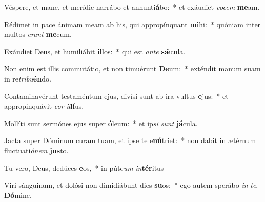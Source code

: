 \item Véspere, et mane, et merídie narrábo et annunti\textbf{á}bo:~* et exáudiet \textit{vo}\textit{cem} \textbf{me}am.
\item Rédimet in pace ánimam meam ab his, qui appropínquant \textbf{mi}hi:~* quóniam inter multos \textit{e}\textit{rant} \textbf{me}cum.
\item Exáudiet Deus, et humiliábit \textbf{il}los:~* qui est \textit{an}\textit{te} \textbf{sǽ}cula.
\item Non enim est illis commutátio, et non timuérunt \textbf{De}um:~* exténdit manum suam in re\textit{tri}\textit{bu}\textbf{én}do.
\item Contaminavérunt testaméntum ejus, divísi sunt ab ira vultus \textbf{e}jus:~* et appropinquávit \textit{cor} \textit{il}\textbf{lí}us.
\item Mollíti sunt sermónes ejus super \textbf{ó}leum:~* et ip\textit{si} \textit{sunt} \textbf{já}cula.
\item Jacta super Dóminum curam tuam, et ipse te e\textbf{nú}triet:~* non dabit in ætérnum fluctuati\textit{ó}\textit{nem} \textbf{jus}to.
\item Tu vero, Deus, dedúces \textbf{e}os,~* in púte\textit{um} \textit{in}\textbf{tér}itus
\item Viri sánguinum, et dolósi non dimidiábunt dies \textbf{su}os:~* ego autem sperábo \textit{in} \textit{te}, \textbf{Dó}mine.
